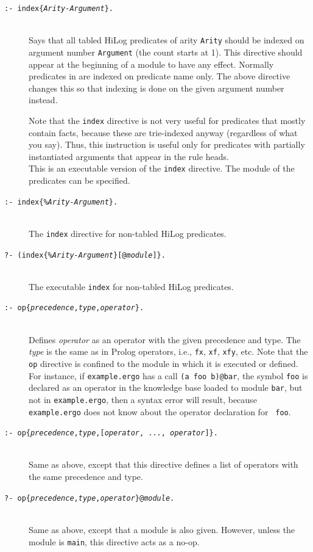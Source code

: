 \documentclass[11pt]{article}
\newcommand{\ERGO}{\mbox{\smaller{\ensuremath{\cal{E}}\smaller{{\sc{RGO}}}}}\xspace}
\newcommand{\FLSYSTEM}{\ERGO}
\newcommand{\ergoext}{ergo\xspace}
\begin{document}
\begin{description}
\item[\texttt{:- index\{\emph{Arity-Argument}\}.}]
  ~~~\\
  Says that all tabled HiLog predicates of arity {\tt Arity} should be indexed on
  argument number {\tt Argument} (the count starts at 1). This directive
  should appear at the beginning of a module to have any effect.
  Normally predicates in \FLSYSTEM are indexed on predicate name only.
  The  above directive changes this so that indexing is done on the given
  argument number instead.

  Note that the {\tt index} directive is not very useful for predicates
  that mostly contain facts, because these are trie-indexed anyway
  (regardless of what you say). Thus, this instruction is useful only for
  predicates with partially instantiated arguments that appear in the rule
  heads.
~~~  \\
  This is an executable version of the {\tt index} directive.  The
  module of the predicates can be specified.
\item[\texttt{:- index\{\emph{\%Arity-Argument}\}.}]
~~~  \\
  The {\tt index} directive for non-tabled HiLog predicates.
\item[\texttt{?- (index\{\emph{\%Arity-Argument}\}[@\emph{module}]\}.}]
~~~  \\
  The executable {\tt index} for non-tabled HiLog predicates.

\item[\texttt{:- op\{{\it precedence},{\it type},{\it operator}\}.}]
 ~~~ \\
  Defines \emph{operator} as an \FLSYSTEM operator with the given precedence
  and type. The \emph{type} is the same as in Prolog operators, i.e.,
  {\tt fx}, {\tt xf}, {\tt xfy}, etc.
  Note that the {\tt op} directive is confined to
  the module in which it is executed or defined. For instance, if
  {\tt example.\ergoext} has a call {\tt (a foo b)@bar}, the symbol {\tt foo} is
  declared as an operator in the knowledge base loaded to module {\tt bar}, but not in
  {\tt example.\ergoext}, then a syntax error will result, because 
   {\tt example.\ergoext} does not know about the operator declaration for {\tt
  foo}.
\item[\texttt{:- op\{{\it precedence},{\it type},[{\it operator}, ..., {\it operator}]\}.}]
~~~  \\
  Same as above, except that this directive defines a list of operators
  with the same precedence and type.
\item[\texttt{?- op\{{\it precedence},{\it type},{\it operator}\}@\emph{module}.}]
 ~~~ \\
  Same as above, except that a module is also given. However, unless the
  module is {\tt main}, this directive acts as a no-op.
\end{description}
\end{document}
